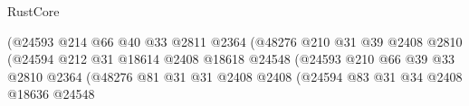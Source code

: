 \begin{lexlean}{RustCore}
\begin{coremodule}
                                                      (@24593
                                                        @214
                                                        @66
                                                        @40
                                                        @33
                                                        @2811
                                                        @2364
                                                        (@48276
                                                          @210
                                                          @31
                                                          @39
                                                          @2408
                                                          @2810
                                                          (@24594
                                                            @212
                                                            @31
                                                            @18614
                                                            @2408
                                                            @18618
                                                            @24548
                                                            (@24593
                                                              @210
                                                              @66
                                                              @39
                                                              @33
                                                              @2810
                                                              @2364
                                                              (@48276
                                                                @81
                                                                @31
                                                                @31
                                                                @2408
                                                                @2408
                                                                (@24594
                                                                  @83
                                                                  @31
                                                                  @34
                                                                  @2408
                                                                  @18636
                                                                  @24548

\end{coremodule}
\end{lexlean}
